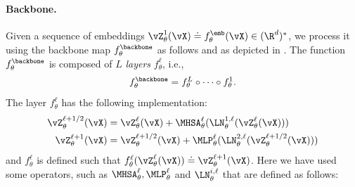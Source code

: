 \documentclass[../../book-main.tex]{subfiles}
\begin{document}
\paragraph{Backbone.} Given a sequence of embeddings
\(\vZ_{\theta}^{1}(\vX) \doteq f_{\theta}^{\emb}(\vX) \in
(\R^{d})^{*}\), we process it using the backbone map
\(f_{\theta}^{\backbone}\) as follows and as depicted in
. The function
\(f_{\theta}^{\backbone}\) is composed of \(L\) \textit{layers}
\(f_{\theta}^{\ell}\), i.e.,
\begin{equation}
    f_{\theta}^{\backbone} = f_{\theta}^{L} \circ \cdots \circ f_{\theta}^{1}.
\end{equation}
The layer \(f_{\theta}^{\ell}\) has the following implementation:
\begin{align}\label{eq:vit-res-block}
    \vZ_{\theta}^{\ell + 1/2}(\vX)
    &= \vZ_{\theta}^{\ell}(\vX) +
    \MHSA_{\theta}^{\ell}(\LN_{\theta}^{1, \ell}(\vZ_{\theta}^{\ell}(\vX))) \\
    \vZ_{\theta}^{\ell + 1}(\vX)
    &= \vZ_{\theta}^{\ell + 1/2}(\vX) +
    \MLP_{\theta}^{\ell}(\LN_{\theta}^{2, \ell}(\vZ_{\theta}^{\ell + 1/2}(\vX)))
\end{align}
and \(f_{\theta}^{\ell}\) is defined such that
\(f_{\theta}^{\ell}(\vZ_{\theta}^{\ell}(\vX)) \doteq
\vZ_{\theta}^{\ell + 1}(\vX)\). Here we have used some operators,
such as \(\MHSA_{\theta}^{\ell}, \MLP_{\theta}^{\ell}\) and
\(\LN_{\theta}^{i, \ell}\) that are defined as follows:
\end{document}
